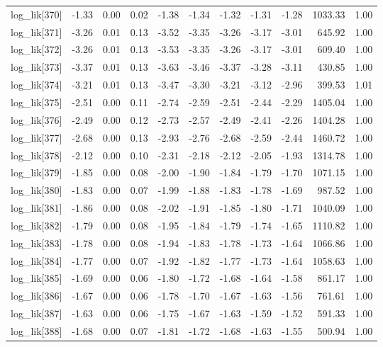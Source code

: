 \begin{table}[ht]
\begin{tabular}{rrrrrrrrrrr}
  log\_lik[370] & -1.33 & 0.00 & 0.02 & -1.38 & -1.34 & -1.32 & -1.31 & -1.28 & 1033.33 & 1.00 \\ 
  log\_lik[371] & -3.26 & 0.01 & 0.13 & -3.52 & -3.35 & -3.26 & -3.17 & -3.01 & 645.92 & 1.00 \\ 
  log\_lik[372] & -3.26 & 0.01 & 0.13 & -3.53 & -3.35 & -3.26 & -3.17 & -3.01 & 609.40 & 1.00 \\ 
  log\_lik[373] & -3.37 & 0.01 & 0.13 & -3.63 & -3.46 & -3.37 & -3.28 & -3.11 & 430.85 & 1.00 \\ 
  log\_lik[374] & -3.21 & 0.01 & 0.13 & -3.47 & -3.30 & -3.21 & -3.12 & -2.96 & 399.53 & 1.01 \\ 
  log\_lik[375] & -2.51 & 0.00 & 0.11 & -2.74 & -2.59 & -2.51 & -2.44 & -2.29 & 1405.04 & 1.00 \\ 
  log\_lik[376] & -2.49 & 0.00 & 0.12 & -2.73 & -2.57 & -2.49 & -2.41 & -2.26 & 1404.28 & 1.00 \\ 
  log\_lik[377] & -2.68 & 0.00 & 0.13 & -2.93 & -2.76 & -2.68 & -2.59 & -2.44 & 1460.72 & 1.00 \\ 
  log\_lik[378] & -2.12 & 0.00 & 0.10 & -2.31 & -2.18 & -2.12 & -2.05 & -1.93 & 1314.78 & 1.00 \\ 
  log\_lik[379] & -1.85 & 0.00 & 0.08 & -2.00 & -1.90 & -1.84 & -1.79 & -1.70 & 1071.15 & 1.00 \\ 
  log\_lik[380] & -1.83 & 0.00 & 0.07 & -1.99 & -1.88 & -1.83 & -1.78 & -1.69 & 987.52 & 1.00 \\ 
  log\_lik[381] & -1.86 & 0.00 & 0.08 & -2.02 & -1.91 & -1.85 & -1.80 & -1.71 & 1040.09 & 1.00 \\ 
  log\_lik[382] & -1.79 & 0.00 & 0.08 & -1.95 & -1.84 & -1.79 & -1.74 & -1.65 & 1110.82 & 1.00 \\ 
  log\_lik[383] & -1.78 & 0.00 & 0.08 & -1.94 & -1.83 & -1.78 & -1.73 & -1.64 & 1066.86 & 1.00 \\ 
  log\_lik[384] & -1.77 & 0.00 & 0.07 & -1.92 & -1.82 & -1.77 & -1.73 & -1.64 & 1058.63 & 1.00 \\ 
  log\_lik[385] & -1.69 & 0.00 & 0.06 & -1.80 & -1.72 & -1.68 & -1.64 & -1.58 & 861.17 & 1.00 \\ 
  log\_lik[386] & -1.67 & 0.00 & 0.06 & -1.78 & -1.70 & -1.67 & -1.63 & -1.56 & 761.61 & 1.00 \\ 
  log\_lik[387] & -1.63 & 0.00 & 0.06 & -1.75 & -1.67 & -1.63 & -1.59 & -1.52 & 591.33 & 1.00 \\ 
  log\_lik[388] & -1.68 & 0.00 & 0.07 & -1.81 & -1.72 & -1.68 & -1.63 & -1.55 & 500.94 & 1.00 \\ 

\end{tabular}
\end{table}
